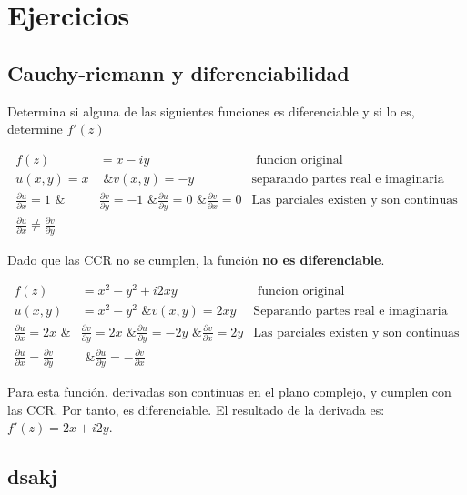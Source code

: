 \section{Ejercicios}

\subsection{Cauchy-riemann y diferenciabilidad}

Determina si alguna de las siguientes funciones es diferenciable y si lo es, determine \( f'(z) \)

\begin{align}
    f(z) &= x - iy & \text{ funcion original } \nonumber \\
    u(x, y) = x &\text{ \& } v(x, y) = -y
        & \text{separando partes real e imaginaria} \nonumber \\
    \frac{\partial u}{\partial x}=1 \text{ \& } 
        &\frac{\partial v}{\partial y}=-1 \text{ \& }
        \frac{\partial u}{\partial y}=0 \text{ \& }
        \frac{\partial v}{\partial x}=0
        & \text{Las parciales existen y son continuas}
        \nonumber \\
    \frac{\partial u}{\partial x}\neq\frac{\partial v}{\partial y}
        & & \nonumber
\end{align}

Dado que las CCR no se cumplen, la función \textbf{no es diferenciable}.

\begin{align}
    f(z) &= x^2 - y^2 + i2xy & \text{ funcion original } \nonumber \\
    u(x, y) &= x^2 - y^2 \text{  \&  } v(x, y) = 2xy
        & \text{Separando partes real e imaginaria} \nonumber \\
    \frac{\partial u}{\partial x}=2x \text{ \& } 
        &\frac{\partial v}{\partial y}=2x \text{ \& }
        \frac{\partial u}{\partial y}=-2y \text{ \& }
        \frac{\partial v}{\partial x}=2y
        & \text{Las parciales existen y son continuas}
        \nonumber \\
    \frac{\partial u}{\partial x}=\frac{\partial v}{\partial y}
        & \text{ \& } \frac{\partial u}{\partial y} = -\frac{\partial v}{\partial x} & \nonumber
\end{align}

Para esta función, derivadas son continuas en el plano complejo, y cumplen con las CCR. Por tanto, es diferenciable. El resultado de la derivada es: \( f'(z) = 2x + i2y \).

\subsection{dsakj}